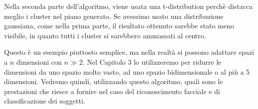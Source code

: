 \documentclass[12pt,italian]{report}
\begin{document}
Nella seconda parte dell'algoritmo, viene usata una t-distribution perchè distacca meglio i cluster nel piano generato. Se avessimo usato una distribuzione gaussiana, come nella prima parte, il risultato ottenuto sarebbe stato meno visibile, in quanto tutti i cluster si sarebbero ammassati al centro.

Questo è un esempio piuttosto semplice, ma nella realtà si possono adattare spazi a $n$ dimensioni con $ n \gg 2 $. Nel Capitolo 3 lo utilizzeremo per ridurre le dimensioni da uno spazio molto vasto, ad uno spazio bidimensionale o al più a 5 dimensioni. Vedremo quindi, utilizzando questo algoritmo, quali sono le prestazioni che riesce a fornire nel caso del riconoscimento facciale e di classificazione dei soggetti.
% 
% 


\end{document}
